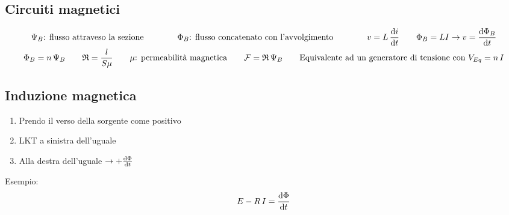 \documentclass[10pt]{article}
\begin{document}
    \vspace{-3\baselineskip}
    \subsection*{Circuiti magnetici}
    \vspace{-1.5\baselineskip}

        \begin{gather*}
            \Psi_B \text{: flusso attraveso la sezione} \qquad\qquad \Phi_B \text{: flusso concatenato con l'avvolgimento} \qquad\qquad v = L \, \dv{i}{t} \qquad \Phi_B = L I \rightarrow v = \dv{\Phi_B}{t}\\
            \Phi_B = n \, \Psi_B \qquad \mathfrak{R} = \frac{l}{S \mu} \qquad \mu \text{: permeabilità magnetica} \qquad \mathcal{F} = \mathfrak{R} \, \Psi_B \qquad \text{Equivalente ad un generatore di tensione con } V_{Eq} = n \, I
        \end{gather*}

    \vspace{-1.5\baselineskip}
    \subsection*{Induzione magnetica}

        \begin{minipage}[t]{.4\textwidth}
            \vspace{-2cm}

            \begin{enumerate}
                \item Prendo il verso della sorgente come positivo
                \item LKT a sinistra dell'uguale
                \item Alla destra dell'uguale \(\rightarrow + \dv{\Phi}{t}\)
            \end{enumerate}

        \end{minipage}
        \hspace{2cm}
        \begin{minipage}[t]{.1\textwidth}
            \vspace{-1.75cm}

            Esempio: 
            \[
                E - R \, I = \dv{\Phi}{t}
            \]

        \end{minipage}
        \hspace{2cm}
        \begin{minipage}[t]{.1\textwidth}

            

        \end{minipage}
\end{document}
